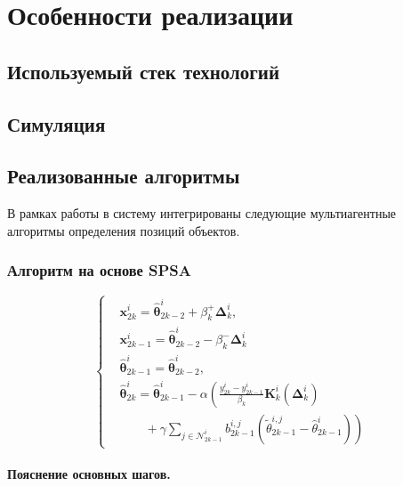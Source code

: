 
\section{Особенности реализации}

\subsection{Используемый стек технологий}
\subsection{Симуляция}
\subsection{Реализованные алгоритмы}

В рамках работы в систему интегрированы следующие мультиагентные алгоритмы определения позиций объектов.

\subsubsection{Алгоритм на основе SPSA}


\[
\left\{
\begin{aligned}
  &\mathbf{x}_{2k}^i = \hat{\boldsymbol{\theta}}_{2k-2}^i + \beta_k^+ \boldsymbol{\Delta}_k^i, \\[0.5em]
  &\mathbf{x}_{2k-1}^i = \hat{\boldsymbol{\theta}}_{2k-2}^i - \beta_k^- \boldsymbol{\Delta}_k^i \\[0.5em]
  &\hat{\boldsymbol{\theta}}_{2k-1}^i = \hat{\boldsymbol{\theta}}_{2k-2}^i, \\[0.5em]
  &\hat{\boldsymbol{\theta}}_{2k}^i = \hat{\boldsymbol{\theta}}_{2k-1}^i - \alpha \left( \frac{y_{2k}^i - y_{2k-1}^i}{\beta_k} \mathbf{K}_k^i(\boldsymbol{\Delta}_k^i) \right. \\[0.5em]
  &\qquad \left. {} + \gamma \sum_{j \in \mathcal{N}_{2k-1}^i} b_{2k-1}^{i,j} (\tilde{\theta}_{2k-1}^{i,j} - \hat{\theta}_{2k-1}^i) \right)
\end{aligned}
\right.
\]


\paragraph{Пояснение основных шагов.}

